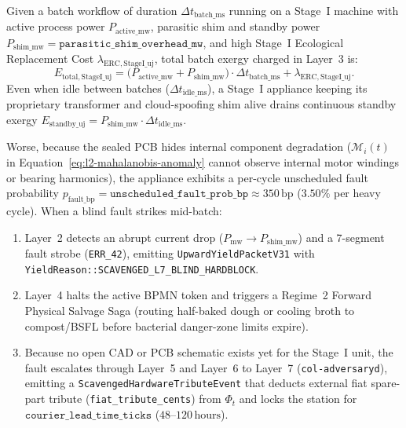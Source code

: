 Given a batch workflow of duration $\Delta t_{\mathrm{batch\_ms}}$ running on a Stage~I machine with active process power $P_{\mathrm{active\_mw}}$, parasitic shim and standby power $P_{\mathrm{shim\_mw}} = \mathtt{parasitic\_shim\_overhead\_mw}$, and high Stage~I Ecological Replacement Cost $\lambda_{\mathrm{ERC,StageI\_uj}}$, total batch exergy charged in Layer~3 is:
\begin{equation}
    E_{\mathrm{total,StageI\_uj}} = \bigl(P_{\mathrm{active\_mw}} + P_{\mathrm{shim\_mw}}\bigr)\cdot \Delta t_{\mathrm{batch\_ms}} + \lambda_{\mathrm{ERC,StageI\_uj}}.
    \label{eq:l2-stage1-total-exergy}
\end{equation}
Even when idle between batches ($\Delta t_{\mathrm{idle\_ms}}$), a Stage~I appliance keeping its proprietary transformer and cloud-spoofing shim alive drains continuous standby exergy $E_{\mathrm{standby\_uj}} = P_{\mathrm{shim\_mw}} \cdot \Delta t_{\mathrm{idle\_ms}}$.

Worse, because the sealed PCB hides internal component degradation ($\mathcal{M}_i(t)$ in Equation~\eqref{eq:l2-mahalanobis-anomaly} cannot observe internal motor windings or bearing harmonics), the appliance exhibits a per-cycle unscheduled fault probability $p_{\mathrm{fault\_bp}} = \mathtt{unscheduled\_fault\_prob\_bp} \approx 350\,\mathrm{bp}$ ($3.50\%$ per heavy cycle). When a blind fault strikes mid-batch:
\begin{enumerate}
    \item Layer~2 detects an abrupt current drop ($P_{\mathrm{mw}} \to P_{\mathrm{shim\_mw}}$) and a 7-segment fault strobe (\texttt{ERR\_42}), emitting \texttt{UpwardYieldPacketV31} with \texttt{YieldReason::SCAVENGED\_L7\_BLIND\_HARDBLOCK}.
    \item Layer~4 halts the active BPMN token and triggers a Regime~2 Forward Physical Salvage Saga (routing half-baked dough or cooling broth to compost/BSFL before bacterial danger-zone limits expire).
    \item Because no open CAD or PCB schematic exists yet for the Stage~I unit, the fault escalates through Layer~5 and Layer~6 to Layer~7 (\texttt{col-adversaryd}), emitting a \texttt{ScavengedHardwareTributeEvent} that deducts external fiat spare-part tribute (\texttt{fiat\_tribute\_cents}) from $\Phi_t$ and locks the station for $\mathtt{courier\_lead\_time\_ticks}$ ($48\text{--}120\,\mathrm{hours}$).
\end{enumerate}


